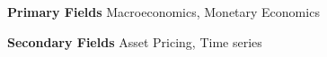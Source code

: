 

\begin{cventries}

    \cventry
    {\textbf{Primary Fields}} %
    {} %
    {}
    {}
    {Macroeconomics, Monetary Economics}

    \cventry
    {\textbf{Secondary Fields}} %
    {} %
    {}
    {}
    {Asset Pricing, Time series}

\end{cventries}
